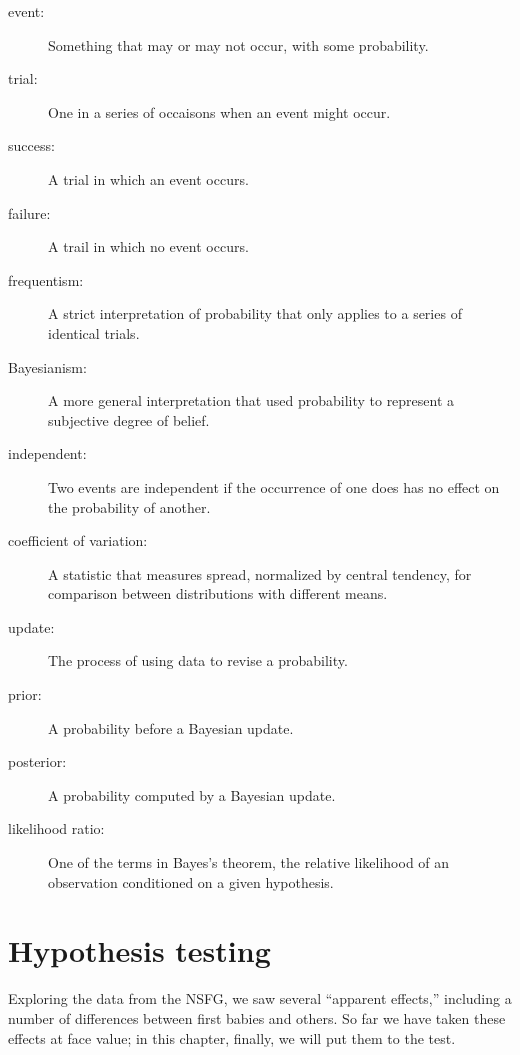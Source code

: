 \documentclass[12pt]{book}
\begin{document}
\begin{description}

\item[event:] Something that may or may not occur, with some probability.

\item[trial:] One in a series of occaisons when an event might occur.

\item[success:] A trial in which an event occurs.

\item[failure:] A trail in which no event occurs.

\item[frequentism:] A strict interpretation of probability that only
applies to a series of identical trials.

\item[Bayesianism:] A more general interpretation that used
probability to represent a subjective degree of belief.

\item[independent:] Two events are independent if the occurrence of
one does has no effect on the probability of another.

\item[coefficient of variation:] A statistic that measures spread,
normalized by central tendency, for comparison between distributions
with different means.

\item[update:] The process of using data to revise a probability.

\item[prior:] A probability before a Bayesian update.

\item[posterior:] A probability computed by a Bayesian update.

\item[likelihood ratio:] One of the terms in Bayes's theorem, the
relative likelihood of an observation conditioned on a given hypothesis.

\end{description}



\chapter{Hypothesis testing}

Exploring the data from the NSFG, we saw several ``apparent effects,''
including a number of differences between first babies and others.
So far we have taken these effects at face value; in this chapter,
finally, we will put them to the test.
\end{document}
